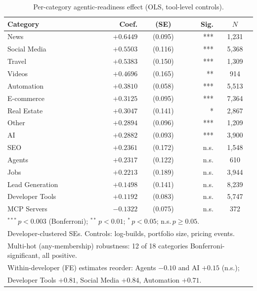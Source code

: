 \begin{table}[t]
  \centering
  \caption{Per-category agentic-readiness effect (OLS, tool-level controls).}
  \label{tab:eligibility_category}
  \small
  \begin{tabular}{lrcrc}
    \toprule
    Category & Coef. & (SE) & Sig. & $N$ \\
    \midrule
    News             & $+0.6449$ & (0.095) & ***  & 1,231 \\
    Social Media     & $+0.5503$ & (0.116) & ***  & 5,368 \\
    Travel           & $+0.5383$ & (0.150) & ***  & 1,309 \\
    Videos           & $+0.4696$ & (0.165) & **   & 914 \\
    Automation       & $+0.3810$ & (0.058) & ***  & 5,513 \\
    E-commerce       & $+0.3125$ & (0.095) & ***  & 7,364 \\
    Real Estate      & $+0.3047$ & (0.141) & *    & 2,867 \\
    Other            & $+0.2894$ & (0.096) & ***  & 1,209 \\
    AI               & $+0.2882$ & (0.093) & ***  & 3,900 \\
    SEO              & $+0.2361$ & (0.172) & n.s. & 1,548 \\
    Agents           & $+0.2317$ & (0.122) & n.s. & 610 \\
    Jobs             & $+0.2213$ & (0.189) & n.s. & 3,944 \\
    Lead Generation  & $+0.1498$ & (0.141) & n.s. & 8,239 \\
    Developer Tools  & $+0.1192$ & (0.083) & n.s. & 5,747 \\
    MCP Servers      & $-0.1322$ & (0.075) & n.s. & 372 \\
    \bottomrule
    \multicolumn{5}{l}{\footnotesize $^{***}\,p<0.003$ (Bonferroni); $^{**}\,p<0.01$; $^{*}\,p<0.05$; n.s.\,$p\geq 0.05$.} \\
    \multicolumn{5}{l}{\footnotesize Developer-clustered SEs. Controls: log-builds, portfolio size, pricing events.} \\
    \multicolumn{5}{l}{\footnotesize Multi-hot (any-membership) robustness: 12 of 18 categories Bonferroni-significant, all positive.} \\
    \multicolumn{5}{l}{\footnotesize Within-developer (FE) estimates reorder: Agents $-0.10$ and AI $+0.15$ (n.s.);} \\
    \multicolumn{5}{l}{\footnotesize Developer Tools $+0.81$, Social Media $+0.84$, Automation $+0.71$.}
  \end{tabular}
\end{table}